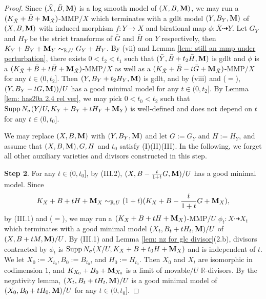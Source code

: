 \documentclass[11pt]{amsart}
\numberwithin{equation}{section}
\newcommand{\Mm}{{\bf{M}}}
\newcommand{\Rr}{\mathbb{R}}
\newcommand{\Supp}{\operatorname{Supp}}
\theoremstyle{definition}
\theoremstyle{definition}
\theoremstyle{definition}
\begin{document}
\begin{proof}
Since $(\bar X,\bar B,\Mm)$ is a log smooth model of $(X,B,\Mm)$, we may run a $(K_{\bar X}+\bar B+\Mm_{\bar X})$-MMP$/X$ which terminates with a gdlt model $(Y,B_Y,\Mm)$ of $(X,B,\Mm)$ with induced morphism $f: Y\rightarrow X$ and birational map $\phi: \bar X\dashrightarrow Y$. Let $G_Y$ and $H_Y$ be the strict transforms of $\bar G$ and $\bar H$ on $Y$ respectively, then $K_Y+B_Y+\Mm_Y\sim_{\Rr,U}G_Y+H_Y$. By (vii) and Lemma \ref{lem: still an mmp under perturbation}, there exists $0<t_2<t_1$ such that $(\bar Y,\bar B+t_2\bar H,\Mm)$ is gdlt and $\phi$ is a $(K_{\bar X}+\bar B+t\bar H+\Mm_{\bar X})$-MMP$/X$ as well as a $(K_{\bar X}+\bar B-t\bar G+\Mm_{\bar X})$-MMP$/X$ for any $t\in (0,t_2]$. Then $(Y,B_Y+t_2H_Y,\Mm)$ is gdlt, and by (viii) and \cite[Theorem 2.8, Lemma 3.5(2)]{HL21} ($=$\cite[Version 3, Theorem 2.24, Lemma 3.9(2)]{HL21}), $(Y,B_Y-tG,\Mm))/U$ has a good minimal model for any $t\in (0,t_2]$. By Lemma \ref{lem: has20a 2.4 rel ver}, we may pick $0<t_0<t_2$ such that $\Supp N_{\sigma}(Y/U,K_Y+B_Y+tH_Y+\Mm_Y)$ is well-defined and does not depend on $t$ for any $t\in (0,t_0]$.

We may replace $(X,B,\Mm)$ with $(Y,B_Y,\Mm)$ and let $G:=G_Y$ and $H:=H_Y$, and assume that $(X,B,\Mm),G,H$ and $t_0$ satisfy (I)(II)(III). In the following, we forget all other auxiliary varieties and divisors constructed in this step.

\medskip

\noindent\textbf{Step 2}. For any $t\in (0,t_0]$, by (III.2), $(X,B-\frac{t}{1+t}G,\Mm)/U$ has a good minimal model. Since
$$K_X+B+tH+\Mm_X\sim_{\Rr,U}(1+t)(K_X+B-\frac{t}{1+t}G+\Mm_X),$$
by (III.1) and \cite[Theorem 2.8, Lemmas 3.5(2), 4.3]{HL21} ($=$\cite[Version 3, Theorem 2.24, Lemma 3.9(2), 4.2]{HL21}), we may run a $(K_X+B+tH+\Mm_X)$-MMP$/U$ $\phi_t: X\dashrightarrow X_t$ which terminates with a good minimal model $(X_t,B_t+tH_t,\Mm)/U$ of $(X,B+tM,\Mm)/U$. By (III.1) and Lemma \ref{lem: nz for glc divisor}(2.b), divisors contracted by $\phi_t$ is $\Supp N_{\sigma}(X/U,K_X+B+t_0H+\Mm_X)$ and is independent of $t$. We let $X_0:=X_{t_0},B_0:=B_{t_0}$, and $H_0:=H_{t_0}$. Then $X_0$ and $X_t$ are isomorphic in codimension $1$, and $K_{X_0}+B_0+\Mm_{X_0}$ is a limit of movable$/U$ $\Rr$-divisors. By the negativity lemma, $(X_t,B_t+tH_t,\Mm)/U$ is a good minimal model of $(X_0,B_0+tH_0,\Mm)/U$ for any $t\in (0,t_0]$. 


\end{proof}
\end{document}
